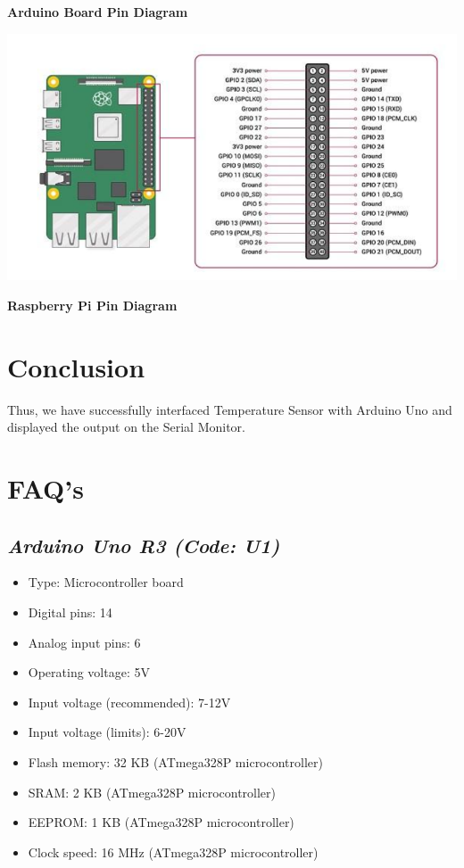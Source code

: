 \documentclass{article}
\begin{document}
\begin{center}
	\textbf{Arduino Board Pin Diagram}
\end{center}
\vspace{10pt}
\begin{center}
	\includegraphics[scale=0.4]{raspberry.png}
\end{center}
\begin{center}
	\textbf{Raspberry Pi Pin Diagram}
\end{center}

\section{\textbf{Conclusion}}
Thus, we have successfully interfaced Temperature Sensor with Arduino Uno and displayed the output on the Serial Monitor.
\section{\textbf{FAQ's}}
\subsection{\textit{Arduino Uno R3 (Code: U1)}}
\begin{itemize}
	\item Type: Microcontroller board 
	\item Digital pins: 14
	\item Analog input pins: 6
	\item Operating voltage: 5V
	\item Input voltage (recommended): 7-12V
	\item Input voltage (limits): 6-20V
	\item Flash memory: 32 KB (ATmega328P microcontroller) 
	\item SRAM: 2 KB (ATmega328P microcontroller)
	\item EEPROM: 1 KB (ATmega328P microcontroller)
	\item Clock speed: 16 MHz (ATmega328P microcontroller)
\end{itemize}
\end{document}
